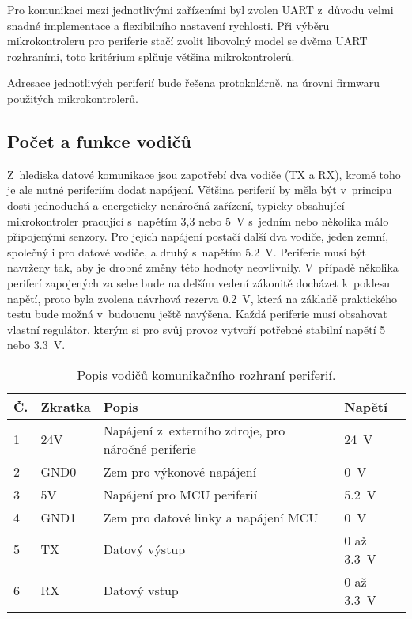         Pro komunikaci mezi jednotlivými zařízeními byl zvolen UART z~důvodu velmi snadné implementace a flexibilního nastavení rychlosti. Při výběru mikrokontroleru pro periferie stačí zvolit libovolný model se dvěma UART rozhraními, toto kritérium splňuje většina mikrokontrolerů.

        Adresace jednotlivých periferií bude řešena protokolárně, na úrovni firmwaru použitých mikrokontrolerů.


    \subsection{Počet a funkce vodičů}
        \label{subsec:pocet-a-fce-vodicu-sbernice}
        Z~hlediska datové komunikace jsou zapotřebí dva vodiče (TX a RX), kromě toho je ale nutné periferiím dodat napájení. Většina periferií by měla být v~principu dosti jednoduchá a energeticky nenáročná zařízení, typicky obsahující mikrokontroler pracující s~napětím 3,3 nebo \qty{5}{V} s~jedním nebo několika málo připojenými senzory. Pro jejich napájení postačí další dva vodiče, jeden zemní, společný i pro datové vodiče, a druhý s~napětím \qty{5.2}{V}. Periferie musí být navrženy tak, aby je drobné změny této hodnoty neovlivnily. V~případě několika periferí zapojených za sebe bude na delším vedení zákonitě docházet k~poklesu napětí, proto byla zvolena návrhová rezerva \qty{0.2}{V}, která na základě praktického testu bude možná v~budoucnu ještě navýšena. Každá periferie musí obsahovat vlastní regulátor, kterým si pro svůj provoz vytvoří potřebné stabilní napětí 5 nebo \qty{3,3}{V}. 
        \begin{table}[h!]
            \centering
            \caption{Popis vodičů komunikačního rozhraní periferií.}
            \label{tab:sbernice-popis-vodicu}
            \begin{tabular}{|l|l|l|l|}
                \hline
                \textbf{Č.} & \textbf{Zkratka} & \textbf{Popis} & \textbf{Napětí} \\
                \hline\hline
                1 & 24V & Napájení z~externího zdroje, pro náročné periferie & \qty{24}{V} \\
                \hline
                2 & GND0 & Zem pro výkonové napájení & \qty{0}{V}\\
                \hline
                3 & 5V & Napájení pro MCU periferií & \qty{5.2}{V}\\
                \hline
                4 & GND1 & Zem pro datové linky a napájení MCU & \qty{0}{V}\\
                \hline
                5 & TX & Datový výstup & 0 až \qty{3.3}{V}\\
                \hline
                6 & RX & Datový vstup & 0 až \qty{3.3}{V}\\
                \hline
            \end{tabular}
        \end{table}

